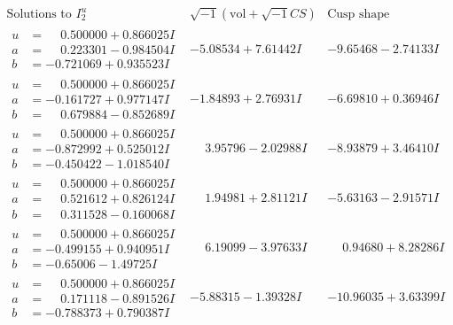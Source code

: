 \documentclass[1p]{elsarticle_modified}
\theoremstyle{definition}
\newcommand{\I}{\sqrt{-1}}
\begin{document}
$$\begin{array}{c|c|c}  
\text{Solutions to }I^u_{2}& \I (\text{vol} + \sqrt{-1}CS) & \text{Cusp shape}\\
 \hline 
\begin{aligned}
u &= \phantom{-}0.500000 + 0.866025 I \\
a &= \phantom{-}0.223301 - 0.984504 I \\
b &= -0.721069 + 0.935523 I\end{aligned}
 & -5.08534 + 7.61442 I & -9.65468 - 2.74133 I \\ \hline\begin{aligned}
u &= \phantom{-}0.500000 + 0.866025 I \\
a &= -0.161727 + 0.977147 I \\
b &= \phantom{-}0.679884 - 0.852689 I\end{aligned}
 & -1.84893 + 2.76931 I & -6.69810 + 0.36946 I \\ \hline\begin{aligned}
u &= \phantom{-}0.500000 + 0.866025 I \\
a &= -0.872992 + 0.525012 I \\
b &= -0.450422 - 1.018540 I\end{aligned}
 & \phantom{-}3.95796 - 2.02988 I & -8.93879 + 3.46410 I \\ \hline\begin{aligned}
u &= \phantom{-}0.500000 + 0.866025 I \\
a &= \phantom{-}0.521612 + 0.826124 I \\
b &= \phantom{-}0.311528 - 0.160068 I\end{aligned}
 & \phantom{-}1.94981 + 2.81121 I & -5.63163 - 2.91571 I \\ \hline\begin{aligned}
u &= \phantom{-}0.500000 + 0.866025 I \\
a &= -0.499155 + 0.940951 I \\
b &= -0.65006 - 1.49725 I\end{aligned}
 & \phantom{-}6.19099 - 3.97633 I & \phantom{-}0.94680 + 8.28286 I \\ \hline\begin{aligned}
u &= \phantom{-}0.500000 + 0.866025 I \\
a &= \phantom{-}0.171118 - 0.891526 I \\
b &= -0.788373 + 0.790387 I\end{aligned}
 & -5.88315 - 1.39328 I & -10.96035 + 3.63399 I \\ \hline\begin{aligned}

\end{aligned}
\end{array}$$
\end{document}
